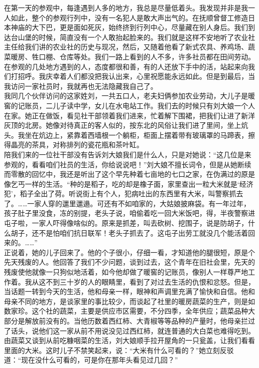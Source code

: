 在第一天的参观中，每逢遇到人多的地方，我总是尽量低着头。我发现并非是我一人如此，整个的参观行列中，没有一名犯人是敢大声出气的。在抚顺曾督工修造日本神庙的大下巴，更是面如死灰，始终挤到行列中心，尽量藏在别人身后。我们到达台山堡的时候，简直没有一个人敢抬起脸来的。我们就是这样不安地听了农业社主任给我们讲的农业社的历史与现况，然后，又随着他看了新式农具、养鸡场、蔬菜暖房、牲口棚、仓库等处。我们一路上看到的人不多，许多社员都在田间劳动。在参观的几处地方遇到的人，态度都很和善，有的人还放下手中的活，站起来向我们打招呼。我庆幸着人们都没把我认出来，心里祝愿能永远如此。但是到最后，当我访问一家社员时，我就再也无法隐藏我自己了。\\

我同几个伙伴访问的这家姓刘，一共五口人，老夫妇俩参加农业劳动，大儿子是暖窖的记账员，二儿子读中学，女儿在水电站工作。我们去的时候只有刘大娘一个人在家。她正在做饭，看见社干部领着我们进来，忙着解下围裙，把我们让进了新洋灰顶的北房。她像对待真正的客人似的，按东北的风俗让我们进了里间，坐上炕头。我坐在炕边上，紧靠着西墙根一个躺柜，柜面上摆着带有玻璃罩的马蹄表，擦得晶亮的茶具，对称排列的瓷花瓶和茶叶缸。\\

陪我们来的一位社干部没有告诉刘大娘我们是什么人，只是对她说：“这几位是来参观的，看看咱们社员的生活，你给说说吧！”刘大娘不擅长词令，但是从她断续而零散的回忆中，我还是听出了这个早先种着七亩地的七口之家，在伪满过的原是像乞丐一样的生活。“种的是稻子，吃的却是橡子面，家里查出一粒大米就是‘经济犯’，稻子全出了荷。听说街上有个人，犯病吐出的东西里有大米，叫警察抓去了。……一家人穿的邋里邋遢。可还有不如咱家的，大姑娘披麻袋。有一年过年，孩子肚子里没食，冻的别提，老头子说，咱偷着吃一回大米饭吧，得，半夜警察进屯子啦，一家人吓得像啥似的。原来是抓差，叫去砍树、挖围子，说是防胡子，什么胡子，还不是怕咱们抗日联军！老头子抓去了。这屯子出劳工就没几个能活着回来的。……”\\

正说着，她的儿子回来了。他的个子很小，仔细一看，才知道他的腿很短，原是个先天残废的人。他回答了我们不少问题，谈到过去，这个青年在旧社会里，先天的残废使他就像一只狗似地活着，如今他却做了暖窖的记账员，像别人一样尊严地工作着。我从这不到三十岁的人的眼睛里，看到了对过去生活的仇恨和忿怒。但是，当话题一转到今天的生活，他和母亲一样，眼神和声调里充满了愉快和自信。他和母亲不同的地方，是谈家里的事比较少，而谈起了社里的暖房蔬菜的生产，则是如数家珍。这个社的蔬菜，主要是供应市区需要，不分四季，全年供应；蔬菜品种大部分是解放前没有的。当他历数着西红柿、大青椒等等品种的产量时，他母亲拦过了话头，说他们这一家从前不用说没见过西红柿，就连普通的大白菜也难得吃到。由蔬菜又谈到从前吃糠咽菜的生活，刘大娘顺手拉开屋角的一只瓮盖，让我们看看里面的大米。这时儿子不禁笑起来，说：“大米有什么可看的？”她立刻反驳道：“现在没什么可看的，可是你在那年头看见过几回？”\\

